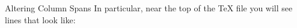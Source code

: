 \documentclass[final]{beamer}
\newlength{\sepwid}
\newlength{\onecolwid}
\newlength{\twocolwid}
\newlength{\threecolwid}
\begin{document}
\begin{frame}[t]
\begin{columns}[t]
\begin{column}{0.475\paperwidth}
\begin{block}{Altering Column Spans}
        In particular, near the top of the TeX file you will see lines that look like:


\end{block}
\end{column}
\end{columns}
\end{frame}
\end{document}
